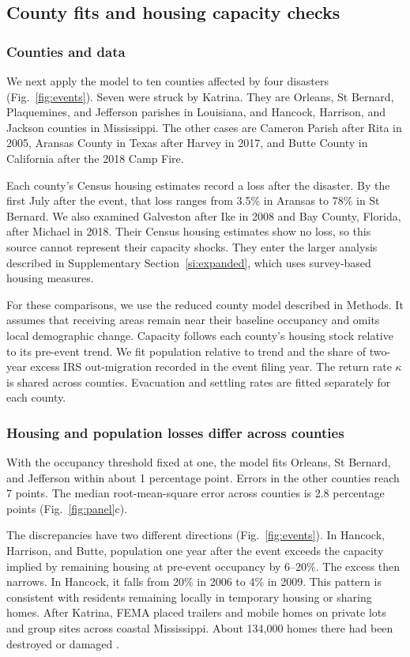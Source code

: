 \documentclass[11pt]{article}
\begin{document}
\subsection{County fits and housing capacity checks}\label{si:county}
\subsubsection{Counties and data}
We next apply the model to ten counties affected by four disasters (Fig.~\ref{fig:events}). Seven were struck by Katrina. They are Orleans, St Bernard, Plaquemines, and Jefferson parishes in Louisiana, and Hancock, Harrison, and Jackson counties in Mississippi. The other cases are Cameron Parish after Rita in 2005, Aransas County in Texas after Harvey in 2017, and Butte County in California after the 2018 Camp Fire.

Each county's Census housing estimates record a loss after the disaster. By the first July after the event, that loss ranges from 3.5\% in Aransas to 78\% in St Bernard. We also examined Galveston after Ike in 2008 and Bay County, Florida, after Michael in 2018. Their Census housing estimates show no loss, so this source cannot represent their capacity shocks. They enter the larger analysis described in Supplementary Section~\ref{si:expanded}, which uses survey-based housing measures.

For these comparisons, we use the reduced county model described in Methods. It assumes that receiving areas remain near their baseline occupancy and omits local demographic change. Capacity follows each county's housing stock relative to its pre-event trend. We fit population relative to trend and the share of two-year excess IRS out-migration recorded in the event filing year. The return rate $\kappa$ is shared across counties. Evacuation and settling rates are fitted separately for each county.

\subsubsection{Housing and population losses differ across counties}
With the occupancy threshold fixed at one, the model fits Orleans, St Bernard, and Jefferson within about 1 percentage point. Errors in the other counties reach 7 points. The median root-mean-square error across counties is 2.8 percentage points (Fig.~\ref{fig:panel}c).

The discrepancies have two different directions (Fig.~\ref{fig:events}). In Hancock, Harrison, and Butte, population one year after the event exceeds the capacity implied by remaining housing at pre-event occupancy by 6--20\%. The excess then narrows. In Hancock, it falls from 20\% in 2006 to 4\% in 2009. This pattern is consistent with residents remaining locally in temporary housing or sharing homes. After Katrina, FEMA placed trailers and mobile homes on private lots and group sites across coastal Mississippi. About 134{,}000 homes there had been destroyed or damaged \citep{GAO2007,EvansCowley2011}.
\end{document}
